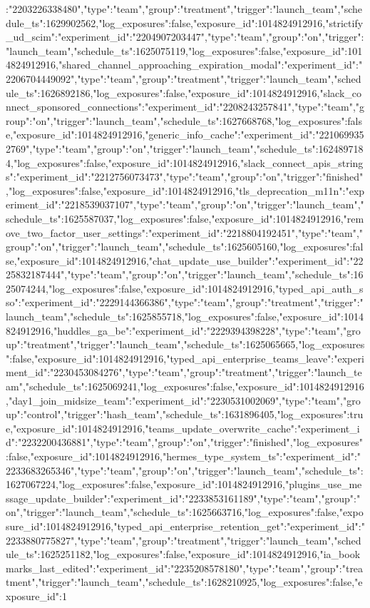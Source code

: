 {:"2203226338480","type":"team","group":"treatment","trigger":"launch_team","schedule_ts":1629902562,"log_exposures":false,"exposure_id":1014824912916},"strictify_ud_scim":{"experiment_id":"2204907203447","type":"team","group":"on","trigger":"launch_team","schedule_ts":1625075119,"log_exposures":false,"exposure_id":1014824912916},"shared_channel_approaching_expiration_modal":{"experiment_id":"2206704449092","type":"team","group":"treatment","trigger":"launch_team","schedule_ts":1626892186,"log_exposures":false,"exposure_id":1014824912916},"slack_connect_sponsored_connections":{"experiment_id":"2208243257841","type":"team","group":"on","trigger":"launch_team","schedule_ts":1627668768,"log_exposures":false,"exposure_id":1014824912916},"generic_info_cache":{"experiment_id":"2210699352769","type":"team","group":"on","trigger":"launch_team","schedule_ts":1624897184,"log_exposures":false,"exposure_id":1014824912916},"slack_connect_apis_strings":{"experiment_id":"2212756073473","type":"team","group":"on","trigger":"finished","log_exposures":false,"exposure_id":1014824912916},"tls_deprecation_m11n":{"experiment_id":"2218539037107","type":"team","group":"on","trigger":"launch_team","schedule_ts":1625587037,"log_exposures":false,"exposure_id":1014824912916},"remove_two_factor_user_settings":{"experiment_id":"2218804192451","type":"team","group":"on","trigger":"launch_team","schedule_ts":1625605160,"log_exposures":false,"exposure_id":1014824912916},"chat_update_use_builder":{"experiment_id":"2225832187444","type":"team","group":"on","trigger":"launch_team","schedule_ts":1625074244,"log_exposures":false,"exposure_id":1014824912916},"typed_api_auth_sso":{"experiment_id":"2229144366386","type":"team","group":"treatment","trigger":"launch_team","schedule_ts":1625855718,"log_exposures":false,"exposure_id":1014824912916},"huddles_ga_be":{"experiment_id":"2229394398228","type":"team","group":"treatment","trigger":"launch_team","schedule_ts":1625065665,"log_exposures":false,"exposure_id":1014824912916},"typed_api_enterprise_teams_leave":{"experiment_id":"2230453084276","type":"team","group":"treatment","trigger":"launch_team","schedule_ts":1625069241,"log_exposures":false,"exposure_id":1014824912916},"day1_join_midsize_team":{"experiment_id":"2230531002069","type":"team","group":"control","trigger":"hash_team","schedule_ts":1631896405,"log_exposures":true,"exposure_id":1014824912916},"teams_update_overwrite_cache":{"experiment_id":"2232200436881","type":"team","group":"on","trigger":"finished","log_exposures":false,"exposure_id":1014824912916},"hermes_type_system_ts":{"experiment_id":"2233683265346","type":"team","group":"on","trigger":"launch_team","schedule_ts":1627067224,"log_exposures":false,"exposure_id":1014824912916},"plugins_use_message_update_builder":{"experiment_id":"2233853161189","type":"team","group":"on","trigger":"launch_team","schedule_ts":1625663716,"log_exposures":false,"exposure_id":1014824912916},"typed_api_enterprise_retention_get":{"experiment_id":"2233880775827","type":"team","group":"treatment","trigger":"launch_team","schedule_ts":1625251182,"log_exposures":false,"exposure_id":1014824912916},"ia_bookmarks_last_edited":{"experiment_id":"2235208578180","type":"team","group":"treatment","trigger":"launch_team","schedule_ts":1628210925,"log_exposures":false,"exposure_id":1}
